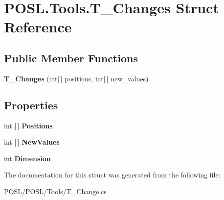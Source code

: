 \hypertarget{structPOSL_1_1Tools_1_1T__Changes}{}\section{P\+O\+S\+L.\+Tools.\+T\+\_\+\+Changes Struct Reference}
\label{structPOSL_1_1Tools_1_1T__Changes}
\subsection*{Public Member Functions}
\begin{DoxyCompactItemize}
\item 
\mbox{\label{structPOSL_1_1Tools_1_1T__Changes_a9962d6f4b60b953ea20d0ead8cadb616}} 
{\bfseries T\+\_\+\+Changes} (int\mbox{[}$\,$\mbox{]} positions, int\mbox{[}$\,$\mbox{]} new\+\_\+values)
\end{DoxyCompactItemize}
\subsection*{Properties}
\begin{DoxyCompactItemize}
\item 
\mbox{\label{structPOSL_1_1Tools_1_1T__Changes_ae3c0d4cff9f5570dd9dd9f2d4ef7dfbe}} 
int \mbox{[}$\,$\mbox{]} {\bfseries Positions}
\item 
\mbox{\label{structPOSL_1_1Tools_1_1T__Changes_a5f0bb645a4dc8b5c5349f070d5428ee5}} 
int \mbox{[}$\,$\mbox{]} {\bfseries New\+Values}
\item 
\mbox{\label{structPOSL_1_1Tools_1_1T__Changes_a148a47ae6df3f5cf7c432456b8681684}} 
int {\bfseries Dimension}
\end{DoxyCompactItemize}


The documentation for this struct was generated from the following file\+:\begin{DoxyCompactItemize}
\item 
P\+O\+S\+L/\+P\+O\+S\+L/\+Tools/T\+\_\+\+Change.\+cs\end{DoxyCompactItemize}
